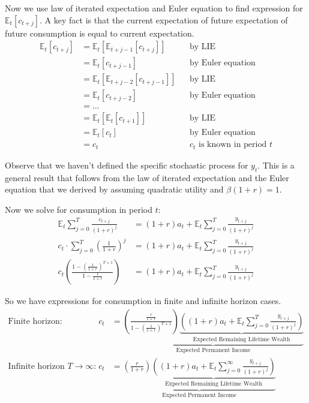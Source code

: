 \documentclass[11pt]{article}
\newcommand{\expectation}{\mathbb{E}}
\begin{document}
Now we use law of iterated expectation and Euler equation to find expression for $\expectation_t[c_{t+j}]$. A key fact is that the current expectation of future expectation of future consumption is equal to current expectation.
\begin{align*}
    \expectation_t[c_{t+j}] &= \expectation_t[\expectation_{t+j-1}[c_{t+j}]] && \text{by LIE} \\
    &= \expectation_t[c_{t+j-1}] && \text{by Euler equation} \\ 
    &= \expectation_t[\expectation_{t+j-2}[c_{t+j-1}]] && \text{by LIE} \\
    &= \expectation_t[c_{t+j-2}] && \text{by Euler equation} \\
    &= \dots \\ 
    &= \expectation_t[\expectation_t[c_{t+1}]] && \text{by LIE} \\ 
    &= \expectation_t[c_t] && \text{by Euler equation}\\ 
    &= c_t && \text{$c_t$ is known in period $t$}
\end{align*}

Observe that we haven't defined the specific stochastic process for $y_t$. This is a general result that follows from the law of iterated expectation and the Euler equation that we derived by assuming quadratic utility and $\beta(1+r) = 1$.

Now we solve for consumption in period $t$:
\begin{align*}
    \expectation_t \sum_{j=0}^T \frac{c_{t+j}}{(1+r)^j} &= (1+r)a_t + \expectation_t \sum_{j=0}^T \frac{y_{t+j}}{(1+r)^j} \\
    c_t \cdot \sum_{j=0}^T \left(\frac{1}{1+r}\right)^j &= (1+r)a_t + \expectation_t \sum_{j=0}^T \frac{y_{t+j}}{(1+r)^j} \\ 
    c_t \left(\frac{1 - \left(\frac{1}{1+r}\right)^{T+1}}{1-\frac{1}{1+r}}\right) &= (1+r)a_t + \expectation_t \sum_{j=0}^T \frac{y_{t+j}}{(1+r)^j}
\end{align*}

So we have expressions for consumption in finite and infinite horizon cases.
\begin{align}
    \text{Finite horizon:} && c_t &= \underbrace{\left(\frac{\frac{r}{1+r}}{1 - \left(\frac{1}{1+r}\right)^{T+1}}\right)\underbrace{\left((1+r)a_t + \expectation_t \sum_{j=0}^T \frac{y_{t+j}}{(1+r)^j}\right)}_{\text{Expected Remaining Lifetime Wealth}}}_{\text{Expected Permanent Income}} \label{eqn:ctstochasticfinite} \\
    \text{Infinite horizon $T \to \infty$:} && c_t &= \underbrace{\left(\frac{r}{1+r}\right)\underbrace{\left((1+r)a_t + \expectation_t \sum_{j=0}^\infty \frac{y_{t+j}}{(1+r)^j}\right)}_{\text{Expected Remaining Lifetime Wealth}}}_{\text{Expected Permanent Income}} \label{eqn:ctstochastic}
\end{align}
\end{document}
